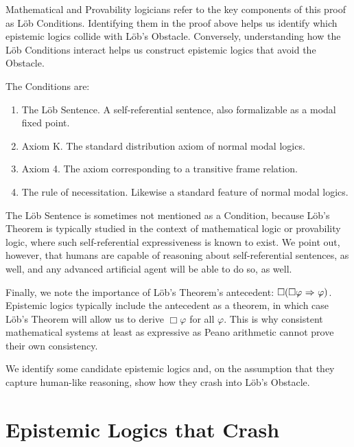 Mathematical and Provability logicians refer to the key components of this proof as L\"ob Conditions. Identifying them in the proof above helps us identify which epistemic logics collide with L\"ob's Obstacle. Conversely, understanding how the L\"ob Conditions interact helps us construct epistemic logics that avoid the Obstacle.

The Conditions are:
\begin{enumerate}
	\item The L\"ob Sentence. A self-referential sentence, also formalizable as a modal fixed point.
	\item Axiom K. The standard distribution axiom of normal modal logics.
	\item Axiom 4. The axiom corresponding to a transitive frame relation.
	\item The rule of necessitation. Likewise a standard feature of normal modal logics.
\end{enumerate} 

The L\"ob Sentence is sometimes not mentioned as a Condition, because L\"ob's Theorem is typically studied in the context of mathematical logic or provability logic, where such self-referential expressiveness is known to exist. We point out, however, that humans are capable of reasoning about self-referential sentences, as well, and any advanced artificial agent will be able to do so, as well. 

Finally, we note the importance of L\"ob's Theorem's antecedent: $\Box(\Box\varphi {\ \Rightarrow \ } \varphi)$. Epistemic logics typically include the antecedent as a theorem, in which case L\"ob's Theorem will allow us to derive $\Box\varphi$ for all $\varphi$. This is why consistent mathematical systems at least as expressive as Peano arithmetic cannot prove their own consistency. 

We identify some candidate epistemic logics and, on the assumption that they capture human-like reasoning, show how they crash into L\"ob's Obstacle.

\section{Epistemic Logics that Crash}
\label{sec:crashing_logics}
